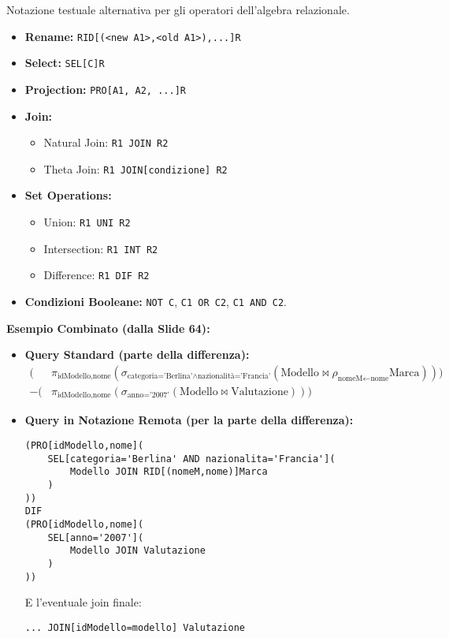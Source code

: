 Notazione testuale alternativa per gli operatori dell'algebra relazionale.
\begin{itemize}
    \item \textbf{Rename:} \texttt{RID[(<new A1>,<old A1>),...]R}
    \item \textbf{Select:} \texttt{SEL[C]R}
    \item \textbf{Projection:} \texttt{PRO[A1, A2, ...]R}
    \item \textbf{Join:}
    \begin{itemize}
        \item Natural Join: \texttt{R1 JOIN R2}
        \item Theta Join: \texttt{R1 JOIN[condizione] R2}
    \end{itemize}
    \item \textbf{Set Operations:}
    \begin{itemize}
        \item Union: \texttt{R1 UNI R2}
        \item Intersection: \texttt{R1 INT R2}
        \item Difference: \texttt{R1 DIF R2}
    \end{itemize}
    \item \textbf{Condizioni Booleane:} \texttt{NOT C}, \texttt{C1 OR C2}, \texttt{C1 AND C2}.
\end{itemize}

\textbf{Esempio Combinato (dalla Slide 64):}
\begin{itemize}
    \item \textbf{Query Standard (parte della differenza):}
    \[
    \begin{split}
    ( & \pi_{\text{idModello,nome}} (\sigma_{\text{categoria='Berlina'} \wedge \text{nazionalità='Francia'}} (\text{Modello} \Join \rho_{\text{nomeM}\leftarrow\text{nome}} \text{Marca}))) \\
    - ( & \pi_{\text{idModello,nome}} (\sigma_{\text{anno='2007'}} (\text{Modello} \Join \text{Valutazione})))
    \end{split}
    \]
    \item \textbf{Query in Notazione Remota (per la parte della differenza):}
\begin{verbatim}
(PRO[idModello,nome](
    SEL[categoria='Berlina' AND nazionalita='Francia'](
        Modello JOIN RID[(nomeM,nome)]Marca
    )
))
DIF
(PRO[idModello,nome](
    SEL[anno='2007'](
        Modello JOIN Valutazione
    )
))
\end{verbatim}
    E l'eventuale join finale:
\begin{verbatim}
... JOIN[idModello=modello] Valutazione
\end{verbatim}
\end{itemize}

